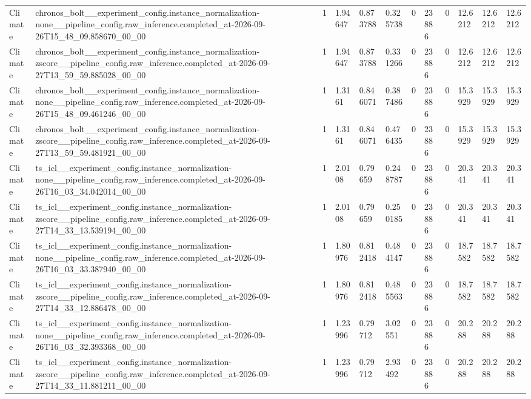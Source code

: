 \begin{tabular}{llllllllllll}
Climate & chronos\_bolt\_\_experiment\_config.instance\_normalization-none\_\_pipeline\_config.raw\_inference.completed\_at-2026-09-26T15\_48\_09.858670\_00\_00 & 1 & 1.94647 & 0.873788 & 0.325738 & 0 & 23886 & 0 & 12.6212 & 12.6212 & 12.6212 \\
Climate & chronos\_bolt\_\_experiment\_config.instance\_normalization-zscore\_\_pipeline\_config.raw\_inference.completed\_at-2026-09-27T13\_59\_59.885028\_00\_00 & 1 & 1.94647 & 0.873788 & 0.331266 & 0 & 23886 & 0 & 12.6212 & 12.6212 & 12.6212 \\
Climate & chronos\_bolt\_\_experiment\_config.instance\_normalization-none\_\_pipeline\_config.raw\_inference.completed\_at-2026-09-26T15\_48\_09.461246\_00\_00 & 1 & 1.3161 & 0.846071 & 0.387486 & 0 & 23886 & 0 & 15.3929 & 15.3929 & 15.3929 \\
Climate & chronos\_bolt\_\_experiment\_config.instance\_normalization-zscore\_\_pipeline\_config.raw\_inference.completed\_at-2026-09-27T13\_59\_59.481921\_00\_00 & 1 & 1.3161 & 0.846071 & 0.476435 & 0 & 23886 & 0 & 15.3929 & 15.3929 & 15.3929 \\
Climate & ts\_icl\_\_experiment\_config.instance\_normalization-none\_\_pipeline\_config.raw\_inference.completed\_at-2026-09-26T16\_03\_34.042014\_00\_00 & 1 & 2.0108 & 0.79659 & 0.248787 & 0 & 23886 & 0 & 20.341 & 20.341 & 20.341 \\
Climate & ts\_icl\_\_experiment\_config.instance\_normalization-zscore\_\_pipeline\_config.raw\_inference.completed\_at-2026-09-27T14\_33\_13.539194\_00\_00 & 1 & 2.0108 & 0.79659 & 0.250185 & 0 & 23886 & 0 & 20.341 & 20.341 & 20.341 \\
Climate & ts\_icl\_\_experiment\_config.instance\_normalization-none\_\_pipeline\_config.raw\_inference.completed\_at-2026-09-26T16\_03\_33.387940\_00\_00 & 1 & 1.80976 & 0.812418 & 0.484147 & 0 & 23886 & 0 & 18.7582 & 18.7582 & 18.7582 \\
Climate & ts\_icl\_\_experiment\_config.instance\_normalization-zscore\_\_pipeline\_config.raw\_inference.completed\_at-2026-09-27T14\_33\_12.886478\_00\_00 & 1 & 1.80976 & 0.812418 & 0.485563 & 0 & 23886 & 0 & 18.7582 & 18.7582 & 18.7582 \\
Climate & ts\_icl\_\_experiment\_config.instance\_normalization-none\_\_pipeline\_config.raw\_inference.completed\_at-2026-09-26T16\_03\_32.393368\_00\_00 & 1 & 1.23996 & 0.79712 & 3.02551 & 0 & 23886 & 0 & 20.288 & 20.288 & 20.288 \\
Climate & ts\_icl\_\_experiment\_config.instance\_normalization-zscore\_\_pipeline\_config.raw\_inference.completed\_at-2026-09-27T14\_33\_11.881211\_00\_00 & 1 & 1.23996 & 0.79712 & 2.93492 & 0 & 23886 & 0 & 20.288 & 20.288 & 20.288 \\

\end{tabular}
